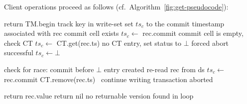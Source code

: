 \noindent
Client operations proceed as follows (cf.~Algorithm~\ref{fig:get-pseudocode}):


\begin{algorithm}[htb]
 \small
  \begin{algorithmic}
       \State  return TM.begin
\EndProcedure
       \State  track key in write-set 
\EndProcedure
%     
{} 
			\State \Comment  set $ts_c$ to the commit timestamp associated with rec
			  \Comment commit cell exists
     				\State $ts_c \leftarrow$  rec.commit 
			\Else \Comment commit cell is empty, check CT
      				\State $ts_c  \leftarrow$ CT.get(rec.ts)  
      				  \Comment no CT entry, set status to  $\bot$
      					  \Comment forced abort successful 
      						\State $ts_c  \leftarrow \bot$ 
      					\EndIf
				\EndIf
      				
 				 	\State \Comment check for race: commit before $\bot$ entry  created 
 				 	\State re-read rec from ds
 				 		 \State $ts_c \leftarrow$  rec.commit 
 				 		 \State CT.remove(rec.ts)
 				 	\Else\  
 				 		 continue	\Comment writing transaction aborted	
 				 	\EndIf
				\EndIf
			\EndIf

 			 	\State return  rec.value 
			\EndIf
      \EndFor
      \State  return nil \Comment no returnable version found in loop
      \EndProcedure






\end{algorithmic}
\end{algorithm}
